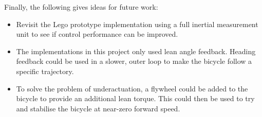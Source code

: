 Finally, the following gives ideas for future work:

\begin{itemize}
\item{Revisit the Lego prototype implementation using a full inertial measurement unit to see if control performance can be improved.}
\item{The implementations in this project only used lean angle feedback. Heading feedback could be used in a slower, outer loop to make the bicycle follow a specific trajectory.}
\item{To solve the problem of underactuation, a flywheel could be added to the bicycle to provide an additional lean torque. This could then be used to try and stabilise the bicycle at near-zero forward speed.}
\end{itemize}